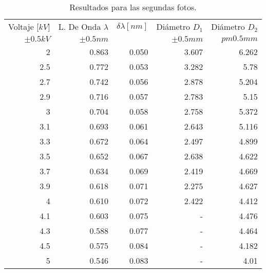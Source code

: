 \documentclass[letterpaper,12pt]{article}
\begin{document}
\begin{table}[htbp]
  \centering
  \caption{Resultados para las segundas fotos.}
    \begin{tabular}{|r|r|r|r|r|}
    \toprule
    Voltaje [$kV$] & L. De Onda $\lambda$ & $\delta \lambda [nm]$ & Diámetro $D_1$ & Diámetro $D_2$ \\
    
    $\pm 0.5 kV$ & $\pm 0.5nm$ &       & $\pm 0.5mm$ & $pm 0.5mm$ \\
    \midrule
    2     & 0.863 & 0.050 & 3.607 & 6.262 \\
    2.5   & 0.772 & 0.053 & 3.282 & 5.78 \\
    2.7   & 0.742 & 0.056 & 2.878 & 5.204 \\
    2.9   & 0.716 & 0.057 & 2.783 & 5.15 \\
    3     & 0.704 & 0.058 & 2.758 & 5.372 \\
    3.1   & 0.693 & 0.061 & 2.643 & 5.116 \\
    3.3   & 0.672 & 0.064 & 2.497 & 4.899 \\
    3.5   & 0.652 & 0.067 & 2.638 & 4.622 \\
    3.7   & 0.634 & 0.069 & 2.419 & 4.669 \\
    3.9   & 0.618 & 0.071 & 2.275 & 4.627 \\
    4     & 0.610 & 0.072 & 2.422 & 4.412 \\
    4.1   & 0.603 & 0.075 & -     & 4.476 \\
    4.3   & 0.588 & 0.077 & -     & 4.464 \\
    4.5   & 0.575 & 0.084 & -     & 4.182 \\
    5     & 0.546 & 0.083     &  -     & 4.01 \\
    \bottomrule
    \end{tabular}%
  \label{tab:addlabel}%
\end{table}%
 
\end{document}

